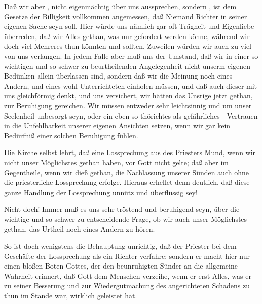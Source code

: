 \begin{aufza}
\item Daß wir aber , nicht eigenmächtig über uns aussprechen, sondern , ist dem Gesetze der Billigkeit vollkommen angemessen, daß Niemand Richter in seiner eigenen Sache seyn soll. Hier würde uns nämlich gar oft Trägheit und Eigenliebe überreden, daß wir Alles gethan, was nur gefordert werden könne, während wir doch viel Mehreres thun könnten und sollten. Zuweilen würden wir auch zu viel von uns verlangen. In jedem Falle aber muß uns der Umstand, daß wir in einer so wichtigen und so schwer zu beurtheilenden Angelegenheit nicht unserm eigenen Bedünken allein überlassen sind, sondern daß wir die Meinung noch eines Andern, und eines wohl Unterrichteten einholen müssen, und daß auch dieser mit uns gleichförmig denkt, und uns versichert, wir hätten das Unsrige jetzt gethan, zur Beruhigung gereichen. Wir müssen entweder sehr leichtsinnig und um unser Seelenheil unbesorgt seyn, oder ein eben so thörichtes als gefährliches~\ Vertrauen in die Unfehlbarkeit unserer eigenen Ansichten setzen, wenn wir gar kein Bedürfniß einer solchen Beruhigung fühlen.\par
{} Die Kirche selbst lehrt, daß eine Lossprechung aus des Priesters Mund, wenn wir nicht unser Möglichstes gethan haben, vor Gott nicht gelte; daß aber im Gegentheile, wenn wir dieß gethan, die Nachlassung unserer Sünden auch ohne die priesterliche Lossprechung erfolge. Hieraus erhellet denn deutlich, daß diese ganze Handlung der Lossprechung unnütz und überflüssig sey!\par
{} Nicht doch! Immer muß es uns sehr tröstend und beruhigend seyn, über die wichtige und so schwer zu entscheidende Frage, ob wir auch unser Möglichstes gethan, das Urtheil noch eines Andern zu hören.\par
{} So ist doch wenigstens die Behauptung unrichtig, daß der Priester bei dem Geschäfte der Lossprechung als ein Richter verfahre; sondern er macht hier nur einen bloßen Boten Gottes, der den beunruhigten Sünder an die allgemeine Wahrheit erinnert, daß Gott dem Menschen verzeihe, wenn er erst Alles, was er zu seiner Besserung und zur Wiedergutmachung des angerichteten Schadens zu thun im Stande war, wirklich geleistet hat.\par

\end{aufza}
